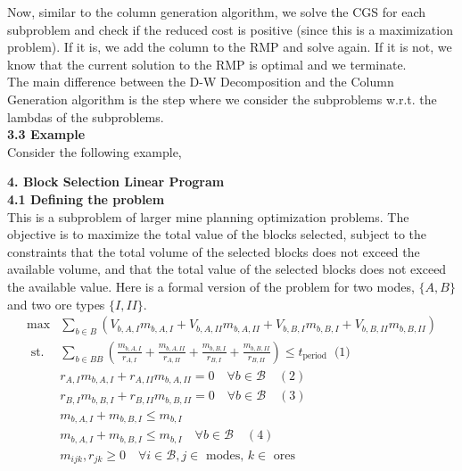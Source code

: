 \documentclass[11pt]{article}
\begin{document}
\noindent Now, similar to the column generation algorithm, we solve the CGS for each subproblem and check if the reduced cost is positive (since this is a maximization problem). If it is, we add the column to the RMP and solve again. If it is not, we know that the current solution to the RMP is optimal and we terminate.
\\

\noindent The main difference between the D-W Decomposition and the Column Generation algorithm is the step where we consider the subproblems w.r.t. the lambdas of the subproblems.
\\

\noindent \textbf{3.3 Example}
\\

\noindent Consider the following example,
\\

\newpage

\noindent \textbf{\large{4. Block Selection Linear Program}} \\

\noindent \textbf{4.1 Defining the problem}
\\

\noindent This is a subproblem of larger mine planning optimization problems. The objective is to maximize the total value of the blocks selected, subject to the constraints that the total volume of the selected blocks does not exceed the available volume, and that the total value of the selected blocks does not exceed the available value. Here is a formal version of the problem for two modes, $\{A, B\}$ and two ore types $\{I, II\}$.
\\

$$
\begin{aligned} 
    \max & \sum_{b \in B}\left(V_{b, A, I} m_{b, A, I}+V_{b, A, II} m_{b, A, II}+V_{b, B, I} m_{b, B, I}+V_{b, B, II} m_{b, B, II}\right) \\ 
    \text { st. } & \sum_{b \in B B}\left(\frac{m_{b, A, I}}{r_{A, I}}+\frac{m_{b, A, II}}{r_{A, II}}+\frac{m_{b, B, I}}{r_{B, I}}+\frac{m_{b, B, II}}{r_{B, II}}\right) \leqslant t_{\text {period }} \text { (1) } \\
    & r_{A,I} m_{b, A, I} + r_{A,II} m_{b, A, II} =0 \quad \forall b \in \mathcal{B} \quad(2) \\
    & r_{B,I} m_{b, B, I} + r_{B,II} m_{b, B, II} =0 \quad \forall b \in \mathcal{B} \quad(3) \\
    & m_{b, A, I}+m_{b, B, I} \leqslant m_{b, I}  \\ 
    & m_{b, A, I}+m_{b, B, I} \leqslant m_{b, I}  \quad \forall b \in \mathcal{B} \quad(4) \\ 
    & m_{i j k}, r_{j k} \geqslant 0 \quad \forall i \in \mathcal{B}, j \in \text { modes, } k \in \text { ores }
\end{aligned}
$$
\\
\end{document}
